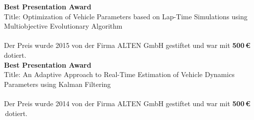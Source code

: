 \documentclass{mycv}
\begin{document}
\begin{paracol}{2}
	  {\RaggedLeft \bfseries Best Presentation Award\\}
	  {Title}: Optimization of Vehicle Parameters based on Lap-Time
	  Simulations using Multiobjective Evolutionary Algorithm\\\\
	  {\footnotesize Der Preis wurde 2015 von der Firma ALTEN GmbH gestiftet und
	  	war mit {\bfseries500\,\euro{}} dotiert.}\\

	  {\RaggedLeft \bfseries Best Presentation Award\\}
	  {Title}: An Adaptive Approach to Real-Time Estimation of
	  Vehicle Dynamics Parameters using Kalman Filtering\\\\
	  {\footnotesize Der Preis wurde 2014 von der Firma ALTEN GmbH gestiftet und
	  	war mit {\bfseries500\,\euro{}} \,dotiert.}\\


\end{paracol}
\end{document}
